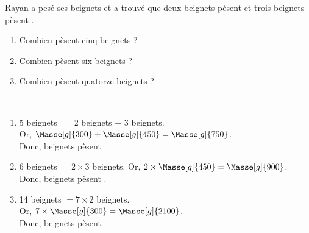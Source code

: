 \begin{exercice*} %
   Rayan a pesé ses beignets et a trouvé que deux beignets pèsent  et trois beignets pèsent .
   \begin{enumerate}
      \item Combien pèsent cinq beignets ?
      \item Combien pèsent six beignets ?
      \item Combien pèsent quatorze beignets ?
   \end{enumerate}
\end{exercice*}

\begin{corrige}
   \ \\ [-5mm]\begin{enumerate}
      \item 5 beignets $=$ 2 beignets $+$ 3 beignets. \\
         Or, $\Masse[g]{300}+\Masse[g]{450} =\Masse[g]{750}$. \\
         Donc, { beignets pèsent }.
      \item 6 beignets $=2\times3$ beignets.
         Or, $2\times\Masse[g]{450} = \Masse[g]{900}$. \\
         Donc, { beignets pèsent }.
      \item 14 beignets $=7\times2$ beignets. \\
         Or, $7\times\Masse[g]{300} =\Masse[g]{2100}$. \\
         Donc, { beignets pèsent }.
   \end{enumerate}
\end{corrige}
